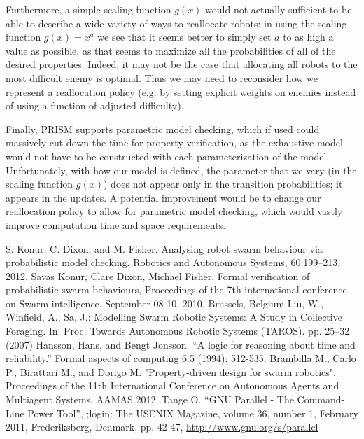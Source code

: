 \documentclass[11pt]{article}
\theoremstyle{definition}
\begin{document}
Furthermore, a simple scaling function $ g(x) $
would not actually sufficient to be able to
describe a wide variety of ways to reallocate
robots: in using the scaling function $ g(x) = x^a $
we see that it seems better to simply set
$ a $ to as high a value as possible, as that
seems to maximize all the probabilities of all
of the desired properties. Indeed, it may not be the
case that allocating all robots to the most
difficult enemy is optimal. Thus we may need
to reconsider how we represent a reallocation policy
(e.g. by setting explicit weights on enemies
instead of using a function of adjusted difficulty).

Finally, PRISM supports parametric model checking,
which if used could massively cut down the
time for property verification, as the exhaustive
model would not have to be constructed with
each parameterization of the model. Unfortunately,
with how our model is defined, the parameter
that we vary (in the scaling function $ g(x) $)
does not appear only in the transition probabilities;
it appears in the updates. A potential improvement
would be to change our reallocation policy to
allow for parametric model checking, which
would vastly improve computation time and
space requirements.

\begin{thebibliography}{99}
        S. Konur, C. Dixon, and M. Fisher.
        Analysing robot swarm behaviour via probabilistic model checking.
        Robotics and Autonomous Systems, 60:199–213,
        2012.
        Savas Konur, Clare Dixon, Michael Fisher.
        Formal verification of probabilistic swarm behaviours,
        Proceedings of the 7th international conference on Swarm intelligence,
        September 08-10, 2010, Brussels, Belgium
        Liu, W., Winfield, A., Sa, J.:
        Modelling Swarm Robotic Systems: A Study in Collective Foraging.
        In: Proc. Towards Autonomous Robotic Systems (TAROS).
        pp. 25–32 (2007)
        Hansson, Hans, and Bengt Jonsson.
        ``A logic for reasoning about time and reliability.''
        Formal aspects of computing 6.5 (1994): 512-535.
        Brambilla M., Carlo P., Birattari M., and Dorigo M.
        "Property-driven design for swarm robotics".
        Proceedings of the 11th International Conference on
        Autonomous Agents and Multiagent Systems.
        AAMAS 2012.
        Tange O.
        ``GNU Parallel - The Command-Line Power Tool'',
        ;login: The USENIX Magazine,
        volume 36, number 1, February 2011,
        Frederiksberg, Denmark,
        pp. 42-47,
        \url{http://www.gnu.org/s/parallel}
\end{thebibliography}
\end{document}
